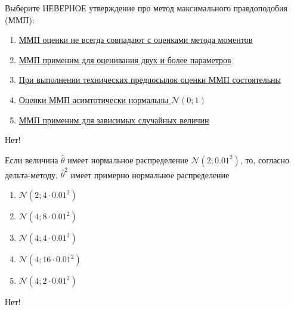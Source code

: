 \documentclass[t]{beamer}
\newcommand{\cN}{\mathcal{N}}
\begin{document}
 \begin{frame} \label{30-No} 
\begin{block}{30} 

  Выберите НЕВЕРНОЕ утверждение про метод максимального правдоподобия (ММП):
  


 \end{block} 
\begin{enumerate} 
\item[] \hyperlink{30-No}{\beamergotobutton{} ММП оценки не всегда совпадают с оценками метода моментов}
\item[] \hyperlink{30-No}{\beamergotobutton{} ММП применим для оценивания двух и более параметров}
\item[] \hyperlink{30-No}{\beamergotobutton{} При выполнении технических предпосылок оценки ММП состоятельны}
\item[] \hyperlink{30-Yes}{\beamergotobutton{} Оценки ММП асимтотически нормальны $\cN(0;1)$}
\item[] \hyperlink{30-No}{\beamergotobutton{} ММП применим для зависимых случайных величин}
\end{enumerate} 

 \alert{Нет!} 
\end{frame} 


 \begin{frame} \label{31-No} 
\begin{block}{31} 

  Если величина $\hat\theta$ имеет нормальное распределение $\cN(2;0.01^2)$, то, согласно дельта-методу, $\hat\theta^2$ имеет примерно нормальное распределение
  


 \end{block} 
\begin{enumerate} 
\item[] \hyperlink{31-No}{\beamergotobutton{} $\cN(2;4\cdot 0.01^2)$}
\item[] \hyperlink{31-No}{\beamergotobutton{} $\cN(4;8\cdot 0.01^2)$}
\item[] \hyperlink{31-No}{\beamergotobutton{} $\cN(4;4\cdot 0.01^2)$}
\item[] \hyperlink{31-Yes}{\beamergotobutton{} $\cN(4;16\cdot 0.01^2)$}
\item[] \hyperlink{31-No}{\beamergotobutton{} $\cN(4;2\cdot 0.01^2)$}
\end{enumerate} 

 \alert{Нет!} 
\end{frame} 
\end{document}

